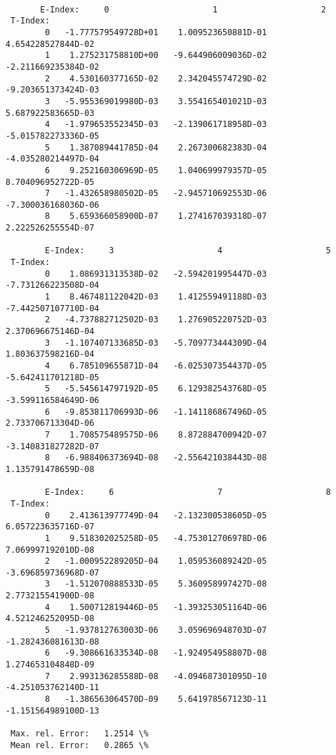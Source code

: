 \documentclass[12pt,dvipdfmx]{article}
\begin{document}
\begin{small}\begin{verbatim}

       E-Index:     0                     1                     2
 T-Index:
        0   -1.777579549728D+01    1.009523650881D-01    4.654228527844D-02
        1    1.275231758810D+00   -9.644906009036D-02   -2.211669235384D-02
        2    4.530160377165D-02    2.342045574729D-02   -9.203651373424D-03
        3   -5.955369019980D-03    3.554165401021D-03    5.687922583665D-03
        4   -1.979653552345D-03   -2.139061718958D-03   -5.015782273336D-05
        5    1.387089441785D-04    2.267300682383D-04   -4.035280214497D-04
        6    9.252160306969D-05    1.040699979357D-05    8.704096952722D-05
        7   -1.432658980502D-05   -2.945710692553D-06   -7.300036168036D-06
        8    5.659366058900D-07    1.274167039318D-07    2.222526255554D-07

        E-Index:     3                     4                     5
 T-Index:
        0    1.086931313538D-02   -2.594201995447D-03   -7.731266223508D-04
        1    8.467481122042D-03    1.412559491188D-03   -7.442507107710D-04
        2   -4.737882712502D-03    1.276905220752D-03    2.370696675146D-04
        3   -1.107407133685D-03   -5.709773444309D-04    1.803637598216D-04
        4    6.785109655871D-04   -6.025307354437D-05   -5.642411701218D-05
        5   -5.545614797192D-05    6.129382543768D-05   -3.599116584649D-06
        6   -9.853811706993D-06   -1.141186867496D-05    2.733706713304D-06
        7    1.708575489575D-06    8.872884700942D-07   -3.140831827282D-07
        8   -6.988406373694D-08   -2.556421038443D-08    1.135791478659D-08

        E-Index:     6                     7                     8
 T-Index:
        0    2.413613977749D-04   -2.132300538605D-05    6.057223635716D-07
        1    9.518302025258D-05   -4.753012706978D-06    7.069997192010D-08
        2   -1.000952289205D-04    1.059536089242D-05   -3.696859736968D-07
        3   -1.512070888533D-05    5.360958997427D-08    2.773215541900D-08
        4    1.500712819446D-05   -1.393253051164D-06    4.521246252095D-08
        5   -1.937812763003D-06    3.059696948703D-07   -1.282436081613D-08
        6   -9.308661633534D-08   -1.924954958807D-08    1.274653104848D-09
        7    2.993136285588D-08   -4.094687301095D-10   -4.251053762140D-11
        8   -1.386563064570D-09    5.641978567123D-11   -1.151564989100D-13

 Max. rel. Error:   1.2514 \%
 Mean rel. Error:   0.2865 \%
\end{verbatim}\end{small}
\end{document}
